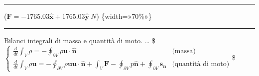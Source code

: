 \documentclass[letterpaper,10pt,italian]{jupyterBook}
\begin{document}
\bigskip\hrule\bigskip


\sphinxAtStartPar
(\(\bm{F} = -1765.03\hat{\bm{x}} + 1765.03\hat{\bm{y}}\  N\))   \{width=»70\%»\}


\bigskip\hrule\bigskip


\sphinxAtStartPar
Bilanci integrali di massa e quantità di moto. … \$\(\begin{cases}
  \frac{d}{dt} \int_V \rho = -\oint_{\partial V} \rho \bm{u} \cdot \hat{\bm{n}}  & \text{(massa)} \\
  \frac{d}{dt} \int_V \rho \bm{u} = -\oint_{\partial V} \rho \bm{u} \bm{u} \cdot \hat{\bm{n}}
  +\int_V \bm{F} - \oint_{\partial V} p \hat{\bm{n}} + \oint_{\partial V} {\bm{s_n}} & \text{(quantità di moto)}
\end{cases}\)\$
\end{document}
